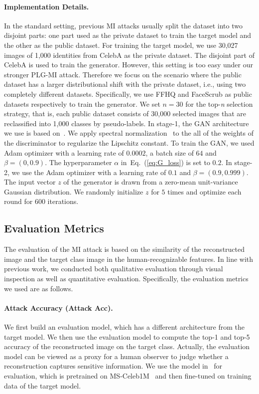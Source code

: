 \documentclass[letterpaper]{article} %
\newcommand{\Eref}[1]{Eq.~(\ref{#1})}
\begin{document}
	
    
\paragraph{Implementation Details.}
In the standard setting, previous MI attacks usually split the dataset into two disjoint parts: one part used as the private dataset to train the target model and the other as the public dataset. For training the target model, we use 30,027 images of 1,000 identities from CelebA as the private dataset. The disjoint part of CelebA is used to train the generator. However, this setting is too easy under our stronger PLG-MI attack. Therefore we focus on the scenario where the public dataset has a larger distributional shift with the private dataset, i.e., using two completely different datasets. Specifically, we use FFHQ and FaceScrub as public datasets respectively to train the generator. We set $n=30$ for the top-\emph{n} selection strategy, that is, each public dataset consists of 30,000 selected images that are reclassified into 1,000 classes by pseudo-labels. In stage-1, the GAN architecture we use is based on~\cite{miyato2018cgans}. We apply spectral normalization~\cite{miyato2018spectral} to the all of the weights of the discriminator to regularize the Lipschitz constant. To train the GAN, we used Adam optimizer with a learning rate of $0.0002$, a batch size of $64$ and $\beta=(0, 0.9)$. The hyperparameter $\alpha$ in~\Eref{eq:G_loss} is set to $0.2$. In stage-2, we use the Adam optimizer with a learning rate of $0.1$ and $\beta = (0.9, 0.999)$. The input vector $z$ of the generator is drawn from a zero-mean unit-variance Gaussian distribution. We randomly initialize $z$ for $5$ times and optimize each round for $600$ iterations.
	

\subsection{Evaluation Metrics}
The evaluation of the MI attack is based on the similarity of the reconstructed image and the target class image in the human-recognizable features. In line with previous work, we conducted both qualitative evaluation through visual inspection as well as quantitative evaluation. Specifically, the evaluation metrics we used are as follows.
	
    
	
    
\paragraph{Attack Accuracy (Attack Acc).} 
We first build an evaluation model, which has a different architecture from the target model. We then use the evaluation model to compute the top-1 and top-5 accuracy of the reconstructed image on the target class. Actually, the evaluation model can be viewed as a proxy for a human observer to judge whether a reconstruction captures sensitive information. We use the model in~\cite{cheng2017know} for evaluation, which is pretrained on MS-Celeb1M~\cite{guo2016ms} and then fine-tuned on training data of the target model.
     
\end{document}
